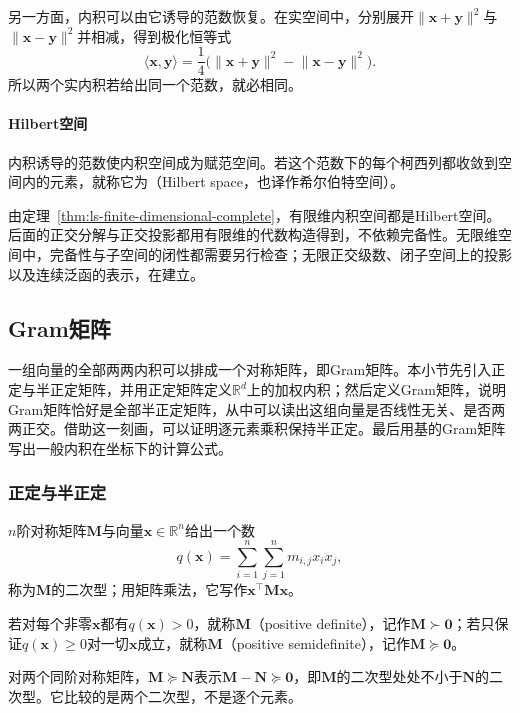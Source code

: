 另一方面，内积可以由它诱导的范数恢复。在实空间中，分别展开$\lVert\bm x+\bm y\rVert^2$与$\lVert\bm x-\bm y\rVert^2$并相减，得到极化恒等式
\[
 \langle\bm x,\bm y\rangle=\frac14\bigl(\lVert\bm x+\bm y\rVert^2-\lVert\bm x-\bm y\rVert^2\bigr).
\]
所以两个实内积若给出同一个范数，就必相同。

\paragraph{Hilbert空间}
\label{sec:ls-hilbert-spaces}
内积诱导的范数使内积空间成为赋范空间。若这个范数下的每个柯西列都收敛到空间内的元素，就称它为（Hilbert space，也译作希尔伯特空间）。

由定理~\ref{thm:ls-finite-dimensional-complete}，有限维内积空间都是Hilbert空间。后面的正交分解与正交投影都用有限维的代数构造得到，不依赖完备性。无限维空间中，完备性与子空间的闭性都需要另行检查；无限正交级数、闭子空间上的投影以及连续泛函的表示，在建立。

\subsection{Gram矩阵}
\label{sec:ls-gram-psd}

一组向量的全部两两内积可以排成一个对称矩阵，即Gram矩阵。本小节先引入正定与半正定矩阵，并用正定矩阵定义$\mathbb R^d$上的加权内积；然后定义Gram矩阵，说明Gram矩阵恰好是全部半正定矩阵，从中可以读出这组向量是否线性无关、是否两两正交。借助这一刻画，可以证明逐元素乘积保持半正定。最后用基的Gram矩阵写出一般内积在坐标下的计算公式。

\subsubsection{正定与半正定}
\label{sec:ls-positive-definite}
$n$阶对称矩阵$\bm M$与向量$\bm x\in\mathbb R^n$给出一个数
\[
 q(\bm x)=\sum_{i=1}^n\sum_{j=1}^n m_{i,j}x_ix_j,
\]
称为$\bm M$的二次型；用矩阵乘法，它写作$\bm x^\top\bm M\bm x$。

若对每个非零$\bm x$都有$q(\bm x)>0$，就称$\bm M$（positive definite），记作$\bm M\succ\bm0$；若只保证$q(\bm x)\geq0$对一切$\bm x$成立，就称$\bm M$（positive semidefinite），记作$\bm M\succeq\bm0$。

对两个同阶对称矩阵，$\bm M\succeq\bm N$表示$\bm M-\bm N\succeq\bm0$，即$\bm M$的二次型处处不小于$\bm N$的二次型。它比较的是两个二次型，不是逐个元素。

